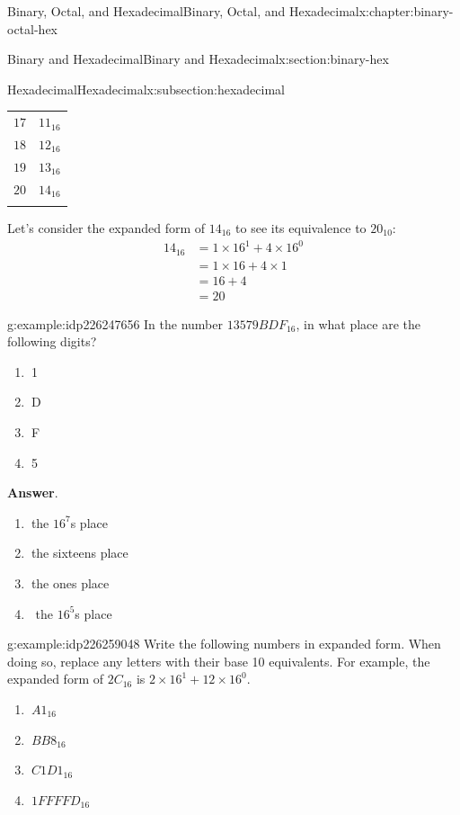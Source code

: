 \documentclass[twoside,10pt,]{book}
\newcommand{\blocktitlefont}{\relax}
\numberwithin{equation}{section}
\newcommand{\hrulethick} {\noalign{\hrule height 0.11em}}
\newcommand{\amp}{&}
\begin{document}
\begin{chapterptx}{Binary, Octal, and Hexadecimal}{}{Binary, Octal, and Hexadecimal}{}{}{x:chapter:binary-octal-hex}
\begin{sectionptx}{Binary and Hexadecimal}{}{Binary and Hexadecimal}{}{}{x:section:binary-hex}
\begin{subsectionptx}{Hexadecimal}{}{Hexadecimal}{}{}{x:subsection:hexadecimal}
\begin{sidebyside}{2}{0.2}{0.2}{0.2}
\begin{sbspanel}{0.2}
{{{\begin{tabular}{cc}
\(17\)&\(11_{16}\)\tabularnewline[0pt]
\(18\)&\(12_{16}\)\tabularnewline[0pt]
\(19\)&\(13_{16}\)\tabularnewline[0pt]
\(20\)&\(14_{16}\)\tabularnewline\hrulethick
\end{tabular}
}%
\par}
}%
\end{sbspanel}%
\end{sidebyside}%
%
\par
Let's consider the expanded form of \(14_{16}\) to see its equivalence to \(20_{10}\): %
\begin{align*}
14_{16} \amp = 1\times16^1+4\times16^0\\
\amp = 1\times 16+4\times 1\\
\amp = 16+4\\
\amp = 20
\end{align*}
%
\begin{example}{}{g:example:idp226247656}%
In the number \(13579BDF_{16}\),  in what place are the following digits? %
\begin{enumerate}
\item{}\(\ \)1%
\item{}\(\ \)D%
\item{}\(\ \)F%
\item{}\(\ \)5%
\end{enumerate}
\par\smallskip%
\noindent\textbf{\blocktitlefont Answer}.\label{g:answer:idp226250984}{}\hypertarget{g:answer:idp226250984}{}\quad{}%
\begin{enumerate}
\item{}\(\ \)the \(16^7\)s place%
\item{}\(\ \)the sixteens place%
\item{}\(\ \)the ones place%
\item{}\(\ \) the \(16^5\)s place%
\end{enumerate}
%
\end{example}
\begin{example}{}{g:example:idp226259048}%
Write the following numbers in expanded form.  When doing so, replace any letters with their base 10 equivalents.  For example, the expanded form of \(2C_{16}\) is \(2\times16^1+12\times16^0\). %
\begin{enumerate}
\item{}\(\displaystyle \ A1_{16}\)%
\item{}\(\displaystyle \ BB8_{16}\)%
\item{}\(\displaystyle \ C1D1_{16}\)%
\item{}\(\displaystyle \ 1FFFFD_{16}\)%

\end{enumerate}
\end{example}
\end{subsectionptx}
\end{sectionptx}
\end{chapterptx}
\end{document}
